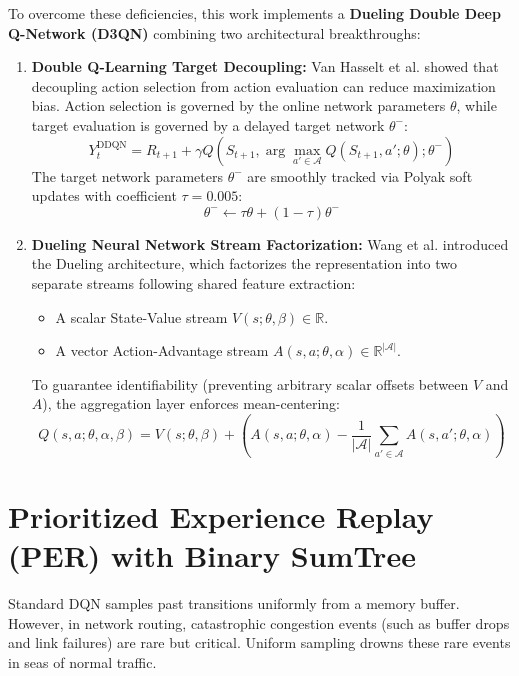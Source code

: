 \documentclass[12pt,a4paper,oneside]{report}
\begin{document}
To overcome these deficiencies, this work implements a \textbf{Dueling Double Deep Q-Network (D3QN)} combining two architectural breakthroughs:

\begin{enumerate}
    \item \textbf{Double Q-Learning Target Decoupling:}
    Van Hasselt et al. \cite{vanhasselt2016deep} showed that decoupling action selection from action evaluation can reduce maximization bias. Action selection is governed by the online network parameters $\theta$, while target evaluation is governed by a delayed target network $\theta^-$:
    \begin{equation}
    \label{eq:double_q_target}
    Y_t^{\text{DDQN}} = R_{t+1} + \gamma Q\left(S_{t+1}, \arg\max_{a' \in \mathcal{A}} Q(S_{t+1}, a'; \theta); \theta^-\right)
    \end{equation}
    The target network parameters $\theta^-$ are smoothly tracked via Polyak soft updates with coefficient $\tau = 0.005$:
    \begin{equation}
    \theta^- \leftarrow \tau \theta + (1 - \tau)\theta^-
    \end{equation}

    \item \textbf{Dueling Neural Network Stream Factorization:}
    Wang et al. \cite{wang2016dueling} introduced the Dueling architecture, which factorizes the representation into two separate streams following shared feature extraction:
    \begin{itemize}
        \item A scalar State-Value stream $V(s; \theta, \beta) \in \mathbb{R}$.
        \item A vector Action-Advantage stream $A(s, a; \theta, \alpha) \in \mathbb{R}^{|\mathcal{A}|}$.
    \end{itemize}
    To guarantee identifiability (preventing arbitrary scalar offsets between $V$ and $A$), the aggregation layer enforces mean-centering:
    \begin{equation}
    \label{eq:dueling_aggregation}
    Q(s, a; \theta, \alpha, \beta) = V(s; \theta, \beta) + \left( A(s, a; \theta, \alpha) - \frac{1}{|\mathcal{A}|} \sum_{a' \in \mathcal{A}} A(s, a'; \theta, \alpha) \right)
    \end{equation}
\end{enumerate}

\section{Prioritized Experience Replay (PER) with Binary SumTree}
Standard DQN samples past transitions uniformly from a memory buffer. However, in network routing, catastrophic congestion events (such as buffer drops and link failures) are rare but critical. Uniform sampling drowns these rare events in seas of normal traffic. 
\end{document}
